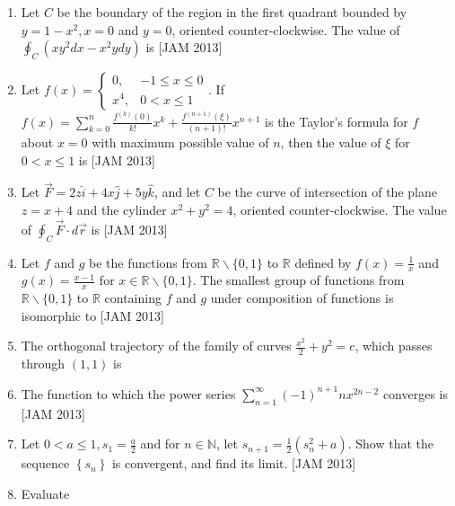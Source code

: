 \begin{enumerate}
\item  Let $C$ be the boundary of the region in the first quadrant bounded by $y=1-x^{2}, x=0$ and $y=0$, oriented counter-clockwise. The value of $\oint_{C}\left(x y^{2} d x-x^{2} y d y\right)$ is
\hfill [JAM 2013]



\item  Let $f(x)=\left\{\begin{array}{cc}0, & -1  \leq x \leq 0  \\ x^{4}, & 0<x \leq 1\end{array}\right.$. If $f(x)=\sum_{k=0}^{n} \frac{f^{(k)}(0)}{k !} x^{k}+\frac{f^{(n+1)}(\xi)}{(n+1) !} x^{n+1}$ is the Taylor's formula for $f$ about $x=0$ with maximum possible value of $n$, then the value of $\xi$ for $0<x \leq 1$ is
\hfill [JAM 2013]



\item  Let $\vec{F}=2 z \hat{i}+4 x \hat{j}+5 y \hat{k}$, and let $C$ be the curve of intersection of the plane $z=x+4$ and the cylinder $x^{2}+y^{2}=4$, oriented counter-clockwise. The value of $\oint_{C} \vec{F} \cdot d \vec{r}$ is
\hfill [JAM 2013]



\item  Let $f$ and $g$ be the functions from $\mathbb{R} \backslash\{0,1\}$ to $\mathbb{R}$ defined by $f(x)=\frac{1}{x}$ and $g(x)=\frac{x-1}{x}$ for $x \in \mathbb{R} \backslash\{0,1\}$. The smallest group of functions from $\mathbb{R} \backslash\{0,1\}$ to $\mathbb{R}$ containing $f$ and $g$ under composition of functions is isomorphic to
\hfill [JAM 2013]



\item  The orthogonal trajectory of the family of curves $\frac{x^{2}}{2}+y^{2}=c$, which passes through $(1,1)$ is \item  The function to which the power series $\sum_{n=1}^{\infty}(-1)^{n+1} n x^{2 n-2}$ converges is
\hfill [JAM 2013]



\item  Let $0<a \leq 1, s_{1}=\frac{a}{2}$ and for $n \in \mathbb{N}$, let $s_{n+1}=\frac{1}{2}\left(s_{n}^{2}+a\right)$. Show that the sequence $\left\{s_{n}\right\}$ is convergent, and find its limit.
\hfill [JAM 2013]



\item  Evaluate


\end{enumerate}
